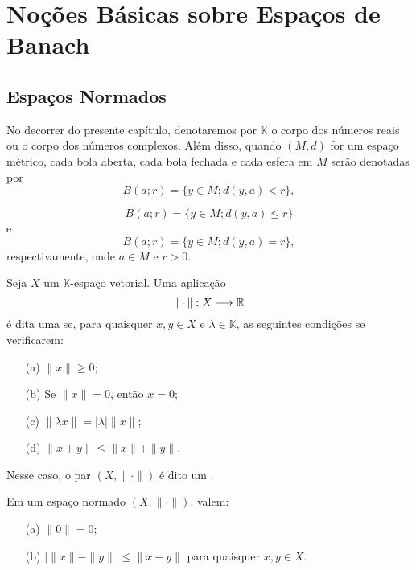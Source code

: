 
\chapter{Noções Básicas sobre Espaços de Banach}

\section{Espaços Normados}

No decorrer do presente capítulo, denotaremos por $\mathbb K$ o corpo dos números reais ou o corpo dos números complexos. Além disso, quando $(M,d)$ for um espaço métrico, cada bola aberta, cada bola fechada e cada esfera em $M$ serão denotadas por
\[
\displaystyle B(a;r)=\{y\in M; d(y,a)<r\},
\]

\[
\displaystyle B(a;r)=\{y\in M; d(y,a)\leq r\}
\]
e
\[
\displaystyle B(a;r)=\{y\in M; d(y,a)=r\},
\]
respectivamente, onde $a\in M$ e $r>0$.

\begin{definition}
    Seja $X$ um $\mathbb K$-espaço vetorial. Uma aplicação
    \[
    \displaystyle \| \cdot \|: X\longrightarrow \mathbb{R}
    \]
    é dita uma   se, para quaisquer $x,y\in X$ e $\lambda \in \mathbb K$, as seguintes condições se verificarem:
    \begin{itemize}
    \item[(a)] $\|x\|\geq 0$;
    \item[(b)] Se $\|x\|=0$, então $x=0$;
    \item[(c)] $\|\lambda x\|=|\lambda| \|x\|$;
    \item[(d)] $\|x+y\|\leq \|x\|+\|y\|$.
    \end{itemize}
    Nesse caso, o par $(X,\|\cdot\|)$ é dito um  .
\end{definition}

\begin{remark}
Em um espaço normado $(X,\|\cdot\|)$, valem:
    \begin{itemize}
    \item[(a)] $\|0\|=0$;
    \item[(b)] $|\|x\|-\|y\|| \leq \|x-y\|$ para quaisquer $x,y \in X$.
    \end{itemize}
\end{remark}

